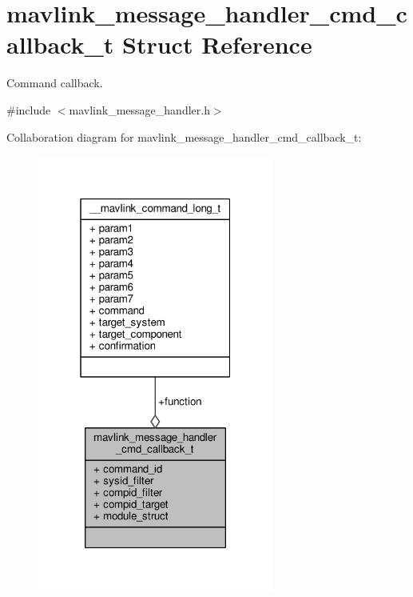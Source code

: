 \hypertarget{structmavlink__message__handler__cmd__callback__t}{\section{mavlink\+\_\+message\+\_\+handler\+\_\+cmd\+\_\+callback\+\_\+t Struct Reference}
\label{structmavlink__message__handler__cmd__callback__t}
}


Command callback.  




{\ttfamily \#include $<$mavlink\+\_\+message\+\_\+handler.\+h$>$}



Collaboration diagram for mavlink\+\_\+message\+\_\+handler\+\_\+cmd\+\_\+callback\+\_\+t\+:
\nopagebreak
\begin{figure}[H]
\begin{center}
\leavevmode
\includegraphics[width=220pt]{structmavlink__message__handler__cmd__callback__t__coll__graph}
\end{center}
\end{figure}
